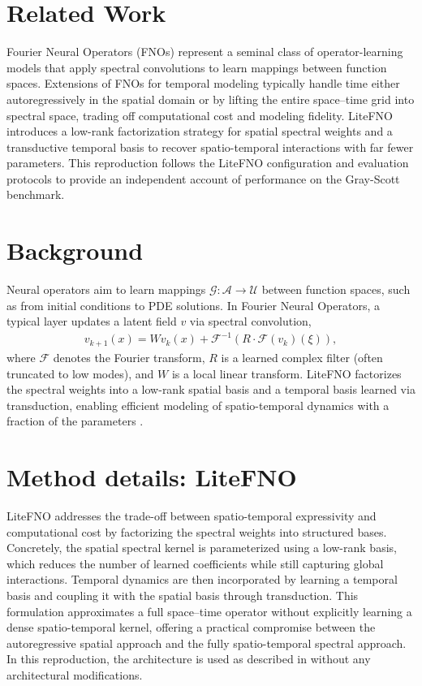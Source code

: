 \documentclass[11pt]{article}
\begin{document}
\section{Related Work}
Fourier Neural Operators (FNOs) \cite{li2020fourier} represent a seminal class of
operator-learning models that apply spectral convolutions to learn mappings
between function spaces. Extensions of FNOs for temporal modeling typically
handle time either autoregressively in the spatial domain or by lifting the
entire space--time grid into spectral space, trading off computational cost and
modeling fidelity. LiteFNO \cite{litefno2025} introduces a low-rank factorization
strategy for spatial spectral weights and a transductive temporal basis to
recover spatio-temporal interactions with far fewer parameters. This
reproduction follows the LiteFNO configuration and evaluation protocols to
provide an independent account of performance on the Gray-Scott benchmark.

\section{Background}
Neural operators aim to learn mappings \(\mathcal{G}: \mathcal{A} \to \mathcal{U}\)
between function spaces, such as from initial conditions to PDE solutions.
In Fourier Neural Operators, a typical layer updates a latent field \(v\) via
spectral convolution,
\begin{align}
v_{k+1}(x) = W v_k(x) + \mathcal{F}^{-1} \left( R \cdot \mathcal{F}(v_k)(\xi) \right),
\end{align}
where \(\mathcal{F}\) denotes the Fourier transform, \(R\) is a learned complex
filter (often truncated to low modes), and \(W\) is a local linear transform.
LiteFNO factorizes the spectral weights into a low-rank spatial basis and a
temporal basis learned via transduction, enabling efficient modeling of
spatio-temporal dynamics with a fraction of the parameters \cite{litefno2025}.

\section{Method details: LiteFNO}
LiteFNO addresses the trade-off between spatio-temporal expressivity and
computational cost by factorizing the spectral weights into structured bases.
Concretely, the spatial spectral kernel is parameterized using a low-rank basis,
which reduces the number of learned coefficients while still capturing global
interactions. Temporal dynamics are then incorporated by learning a temporal
basis and coupling it with the spatial basis through transduction. This
formulation approximates a full space--time operator without explicitly learning
a dense spatio-temporal kernel, offering a practical compromise between the
autoregressive spatial approach and the fully spatio-temporal spectral approach.
In this reproduction, the architecture is used as described in
\cite{litefno2025} without any architectural modifications.
\end{document}
